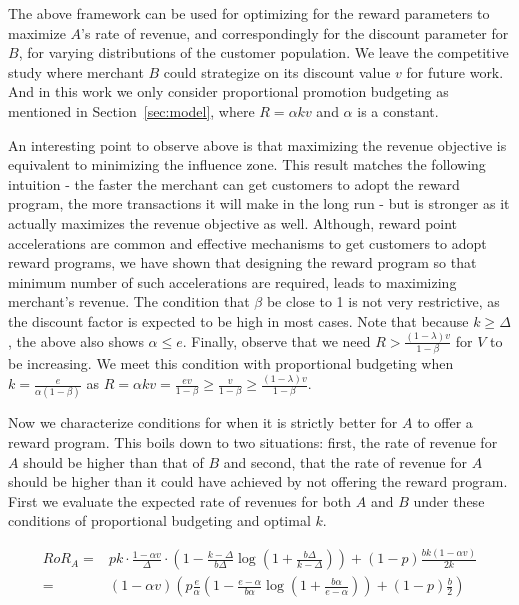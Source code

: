 The above framework can be used for optimizing for the reward parameters to maximize $A$'s rate of revenue, and correspondingly for the discount parameter for $B$, for varying distributions of the customer population.
We leave the competitive study where merchant $B$ could strategize on its discount value $v$ for future work.
And in this work we only consider proportional promotion budgeting as mentioned in Section~\ref{sec:model}, where $R = \alpha k v$ and $\alpha$ is a constant.


An interesting point to observe above is that maximizing the revenue objective is equivalent to minimizing the influence zone.
This result matches the following intuition - the faster the merchant can get customers to adopt the reward program, the more transactions it will make in the long run - but is stronger as it actually maximizes the revenue objective as well. 
Although, reward point accelerations are common and effective mechanisms to get customers to adopt reward programs, we have shown that designing the reward program so that minimum number of such accelerations are required, leads to maximizing merchant's revenue. 
The condition that $\beta$ be close to 1 is not very restrictive, as the discount factor is expected to be high in most cases. 
Note that because $k \geq \Delta$, the above also shows $\alpha \leq e$. 
Finally, observe that we need $R > \frac{(1-\lambda)v}{1-\beta}$ for $V$ to be increasing. 
We meet this condition with proportional budgeting when $k = \frac{e}{\alpha(1-\beta)}$ as $R = \alpha k v = \frac{e v}{1-\beta} \geq \frac{v}{1-\beta} \geq \frac{(1-\lambda)v}{1-\beta}$. 

Now we characterize conditions for when it is strictly better for $A$ to offer a reward program.
This boils down to two situations: first, the rate of revenue for $A$ should be higher than that of $B$ and second, that the rate of revenue for $A$ should be higher than it could have achieved by not offering the reward program.
First we evaluate the expected rate of revenues for both $A$ and $B$ under these conditions of proportional budgeting and optimal $k$.

\begin{align*}
RoR_A =& pk\cdot\frac{1-\alpha v}{\Delta}\cdot\left(1 - \frac{k-\Delta}{b\Delta}\log\left(1+\frac{b\Delta}{k-\Delta}\right)\right) + (1-p)\frac{bk(1-\alpha v)}{2k}\\
      =& (1-\alpha v) \left(p\frac{e}{\alpha}\left(1-\frac{e-\alpha}{b\alpha}\log\left(1+\frac{b\alpha}{e-\alpha}\right)\right) + (1-p)\frac{b}{2}\right)
\end{align*}

